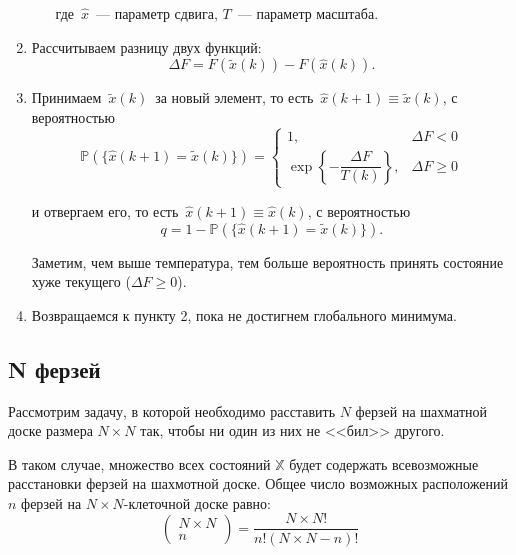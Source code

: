 \begin{enumerate}
\begin{enumerate}
		где~$\widehat{x}$~--- параметр сдвига, $T$~--- параметр масштаба.
		
		
		
		
		
	\end{enumerate}
	
	\item Рассчитываем разницу двух функций:
	\[
	\Delta F = 
	F(\tilde{x}(k)) 
	- 
	F(\widehat{x}(k)).
	\]
	
	\item Принимаем~$\tilde{x}(k)$~за новый элемент, то есть~$\widehat{x}(k+1) \equiv \tilde{x}(k)$, с вероятностью
	\begin{equation}
	\mathbb{P}(\{\widehat{x}(k+1) = \tilde{x}(k)\}) 
	= 
	\begin{cases}
	1,
	& 
	\Delta F <0
	\\
	\exp 
	\left\lbrace 
	- \dfrac {\Delta F}{T(k)}
	\right\rbrace ,    
	&
	\Delta F \geqslant 0
	\end{cases}
	\end{equation}
	
	и отвергаем его, то есть~$\widehat{x}(k+1) \equiv \widehat{x}(k)$, с вероятностью
	\[
	q 
	= 
	1 - \mathbb{P}(\{\widehat{x}(k+1) = \tilde{x}(k)\}).
	\]
	
	Заметим, чем выше температура, тем больше вероятность принять состояние хуже текущего ($\Delta F \geqslant 0$).
	
	\item Возвращаемся к пункту 2, пока не достигнем глобального минимума.
	
\end{enumerate}




\subsection{N ферзей}
\noindent Рассмотрим задачу, в которой необходимо расставить $N$ ферзей на шахматной доске размера $N \times  N$ так, чтобы ни один из них не <<бил>> другого.

В таком случае, множество всех состояний $\mathbb{X}$ будет содержать всевозможные расстановки ферзей на шахмотной доске. Общее число возможных расположений $n$ ферзей на $N \times N$-клеточной доске равно:
\[
{\begin{pmatrix} N \times N  \\ n \end{pmatrix}} = \dfrac{N \times N!}{n! (N \times N - n)!}
\]

